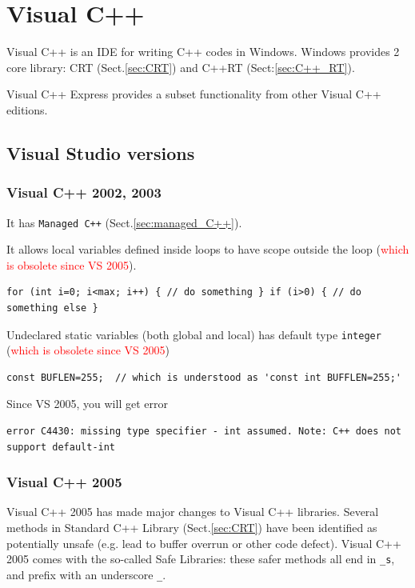 \chapter{Visual C++}
\label{chap:Visual_C++}

Visual C++ is an IDE for writing C++ codes in Windows.
Windows provides 2 core library: CRT (Sect.\ref{sec:CRT})
and C++RT (Sect:\ref{sec:C++_RT}).

Visual C++ Express provides a subset functionality from other Visual C++
editions.

\section{Visual Studio versions}



\subsection{Visual C++ 2002, 2003}

It has \verb!Managed C++! (Sect.\ref{sec:managed_C++}).

It allows local variables defined inside loops to have scope outside the loop (\textcolor{red}{which is obsolete since VS 2005}).
\begin{verbatim}
for (int i=0; i<max; i++) { // do something } if (i>0) { // do something else }
\end{verbatim} 

Undeclared static variables (both global and local) has default type \verb!integer! (\textcolor{red}{which is obsolete since VS 2005})
\begin{verbatim}
const BUFLEN=255;  // which is understood as 'const int BUFFLEN=255;'
\end{verbatim}
Since VS 2005, you will get error
\begin{verbatim}
error C4430: missing type specifier - int assumed. Note: C++ does not support default-int
\end{verbatim}

\subsection{Visual C++ 2005}
\label{sec:VC++_2005}

Visual C++ 2005 has made major changes to Visual C++ libraries.
Several methods in Standard C++ Library (Sect.\ref{sec:CRT}) have been
identified as potentially unsafe (e.g. lead to buffer overrun or other code defect). Visual C++ 2005 comes
with the so-called Safe Libraries: these safer methods all end in \verb!_s!, and
prefix with an underscore \verb!_!.

